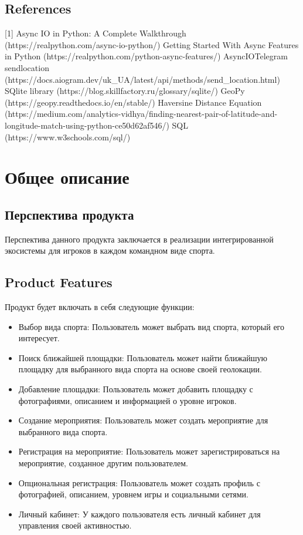 \documentclass{scrreprt}
\begin{document}
\section{References}

[1] Async IO in Python: A Complete Walkthrough
(https://realpython.com/async-io-python/)
\newline
[2] Getting Started With Async Features in Python
(https://realpython.com/python-async-features/)
\newline
[3] AsyncIOTelegram sendlocation (https://docs.aiogram.dev/uk_UA/latest/api/methods/send_location.html)
\newline
[4] SQlite library
(https://blog.skillfactory.ru/glossary/sqlite/)
\newline
[5]  GeoPy
(https://geopy.readthedocs.io/en/stable/)
\newline
[6] Haversine Distance Equation
(https://medium.com/analytics-vidhya/finding-nearest-pair-of-latitude-and-longitude-match-using-python-ce50d62af546/)
\newline
[7] SQL
(https://www.w3schools.com/sql/)

\chapter{Общее описание}

\section{Перспектива продукта}
Перспектива данного продукта заключается в реализации интегрированной экосистемы для игроков в каждом командном виде спорта.

\section{Product Features}
Продукт будет включать в себя следующие функции:
\begin{itemize}
    \item Выбор вида спорта: Пользователь может выбрать вид спорта, который его интересует.
    \item Поиск ближайшей площадки: Пользователь может найти ближайшую площадку для выбранного вида спорта на основе своей геолокации.
    \item Добавление площадки: Пользователь может добавить площадку с фотографиями, описанием и информацией о уровне игроков.
    \item Создание мероприятия: Пользователь может создать мероприятие для выбранного вида спорта.
    \item Регистрация на мероприятие: Пользователь может зарегистрироваться на мероприятие, созданное другим пользователем.
    \item Опциональная регистрация: Пользователь может создать профиль с фотографией, описанием, уровнем игры и социальными сетями.
    \item Личный кабинет: У каждого пользователя есть личный кабинет для управления своей активностью.
\end{itemize}
\end{document}
